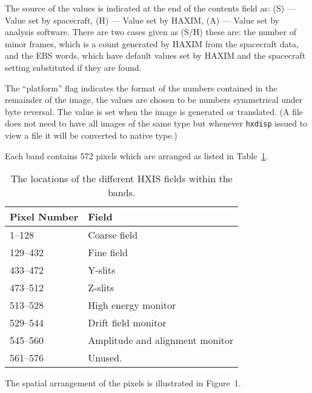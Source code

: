 The source of the values is indicated at the end of the contents field as:
(S) --- Value set by spacecraft, (H) --- Value set by HAXIM, (A) --- Value set
by analysis software. There are two cases given as (S/H)
these
are: the number of minor frames, which is a count generated by HAXIM from the
spacecraft data, and the EBS words, which have default values set by HAXIM and
the spacecraft setting substituted if they are found.

The ``platform'' flag indicates the format of the numbers contained in
the remainder of the image, the values are chosen to be numbers
symmetrical under byte reversal. The value is set when the image is
generated or translated. (A file does not need to have all images of
the same type but whenever \verb!hxdisp! issued to view a file it
will be converted to native type.)

Each band contains 572 pixels which are arranged as listed in Table~\ref{pxls}.
\begin{table}
\begin{center}
\caption{\label{pxls} The locations of the different HXIS fields within the
bands.}
\begin{tabular}{|ll|}
\hline
Pixel Number & Field \\ \hline
1--128 & Coarse field \\
129--432 & Fine field \\
433--472 & Y-slits \\
473--512 & Z-slits \\
513--528 & High energy monitor \\
529--544 & Drift field monitor \\
545--560 & Amplitude and alignment monitor \\
561--576 & Unused. \\ \hline
\end{tabular}
\end{center}
\end{table}

The spatial arrangement of the pixels is illustrated in Figure~1.


          
